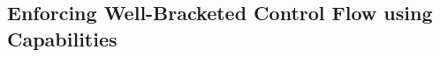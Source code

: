 \documentclass{beamer}
\begin{document}
%
%
%
%
%

\subsection{Enforcing Well-Bracketed Control Flow using Capabilities} %
\end{document}
